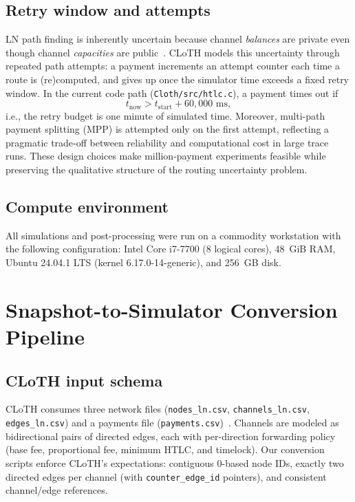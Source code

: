 \documentclass{article}
\begin{document}
\subsection{Retry window and attempts}
LN path finding is inherently uncertain because channel \emph{balances} are private even though channel \emph{capacities} are public~\cite{poon2016lightning}.
CLoTH models this uncertainty through repeated path attempts: a payment increments an attempt counter each time a route is (re)computed, and gives up once the simulator time exceeds a fixed retry window.
In the current code path (\texttt{Cloth/src/htlc.c}), a payment times out if
\[
t_{\mathrm{now}} > t_{\mathrm{start}} + 60{,}000\text{ ms},
\]
i.e., the retry budget is one minute of simulated time.
Moreover, multi-path payment splitting (MPP) is attempted only on the first attempt, reflecting a pragmatic trade-off between reliability and computational cost in large trace runs.
These design choices make million-payment experiments feasible while preserving the qualitative structure of the routing uncertainty problem.

\subsection{Compute environment}
All simulations and post-processing were run on a commodity workstation with the following configuration:
Intel Core i7-7700 (8 logical cores), 48~GiB RAM, Ubuntu 24.04.1 LTS (kernel 6.17.0-14-generic), and 256~GB disk.

\section{Snapshot-to-Simulator Conversion Pipeline}
\label{sec:conversion}

\subsection{CLoTH input schema}
CLoTH consumes three network files (\texttt{nodes\_ln.csv}, \texttt{channels\_ln.csv}, \texttt{edges\_ln.csv}) and a payments file (\texttt{payments.csv})~\cite{conoscenti2021cloth}.
Channels are modeled as bidirectional pairs of directed edges, each with per-direction forwarding policy (base fee, proportional fee, minimum HTLC, and timelock).
Our conversion scripts enforce CLoTH's expectations: contiguous 0-based node IDs, exactly two directed edges per channel (with \texttt{counter\_edge\_id} pointers), and consistent channel/edge references.
\end{document}
